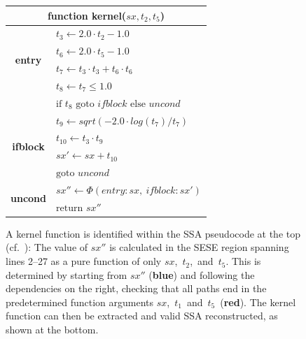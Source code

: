 \begin{figure}[p]
\begin{tabular}{|cl|}
\multicolumn{2}{c}{{\bf function} kernel($sx, t_2, t_5$)}\\
\hline
\multirow{4}{*}{\bf entry\vspace{0.5mm}}
 & $t_3 \leftarrow 2.0\cdot t_2-1.0$\\[-1.7mm]
 & $t_6 \leftarrow 2.0\cdot t_5-1.0$\\[-1.7mm]
 & $t_7 \leftarrow t_3\cdot t_3+t_6\cdot t_6$\\[-1.7mm]
 & $t_8 \leftarrow t_7\leq 1.0$\\[-1.7mm]
 & $\text{if }t_8\text{ goto }ifblock\text{ else }uncond$\\
\hline
\multirow{4}{*}{\bf ifblock\vspace{4mm}}
 & $t_9\leftarrow sqrt(-2.0\cdot log(t_7) / t_7)$\\[-1.7mm]
 & $t_{10}\leftarrow t_3\cdot t_9$\\[-1.7mm]
 & $sx'\leftarrow sx+t_{10}$\\[-1.7mm]
 & $\text{goto }uncond$\\
\hline
\multirow{2}{*}{\bf uncond\vspace{2mm}}
 & $sx''\leftarrow\Phi(entry:sx,\ ifblock:sx')$\\[-1.7mm]
 & $\text{return }sx''$\\
\hline
\end{tabular}
\caption{A kernel function is identified within the SSA pseudocode at the top
    (cf.\ ):
    The value of $sx''$ is calculated in the SESE region spanning lines 2--27
    as a pure function of only \mbox{$sx$, $t_2$, and $t_5$}.
    This is determined by starting from $sx''$
    (\textcolor{color_keywords}{\bf blue}) and following the dependencies on the
    right, checking that all paths end in the predetermined function arguments
    \mbox{$sx$, $t_1$ and $t_5$ (\textcolor{color_types}{\bf red})}.
    The kernel function can then be extracted and valid SSA
    reconstructed, as shown at the bottom.}
\label{kernelexample}
\end{figure}

